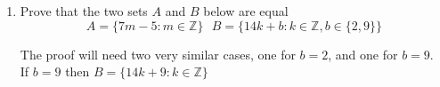 \documentclass[a4paper,11pt]{article}
\begin{document}
\begin{enumerate}
\begin{enumerate}
\end{enumerate}

\item Prove that the two sets $A$ and $B$ below are equal \\
$$ A = \{ 7m - 5 : m \in \mathbb{Z} \} \text{  } B = \{ 14k+b : k \in \mathbb{Z}, b \in \{2, 9\} \}$$

The proof will need two very similar cases, one for $b = 2$, and one for $b = 9$. \\[.2in]
If $b = 9$ then $B = \{14k + 9 : k \in \mathbb{Z}\} $





\end{enumerate}
\end{document}
